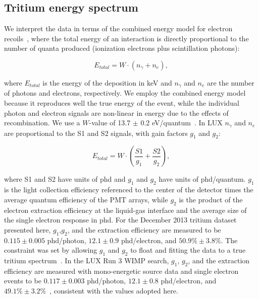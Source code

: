 \subsection{Tritium energy spectrum}

We interpret the data in terms of the combined energy model for electron recoils~\cite{Platzman}, where the total energy of an interaction is directly proportional to the number of quanta produced (ionization electrons plus scintillation photons):

\begin{equation}
E_{total} = W \cdot (n_{\gamma} + n_e ),
\label{platzman_eq}
\end{equation}

\noindent
where $E_{total}$ is the energy of the deposition in keV and  $n_\gamma$ and $n_e$ are the number of photons and electrons, respectively. We employ the combined energy model because it reproduces well the true energy of the event, while the individual photon and electron signals are non-linear in energy due to the effects of recombination. We use a $W$-value of 13.7 $\pm$ 0.2 eV/quantum~\cite{Dahl_Thesis}. In LUX $n_{\gamma}$ and $n_e$ are proportional to the S1 and S2 signals, with gain factors $g_1$ and $g_2$: 

\begin{equation}
E_{total} = W \cdot \left(\frac{S1}{g_1} + \frac{S2}{g_2} \right),
\label{energy_eq}
\end{equation}

\noindent
where S1 and S2 have units of phd and $g_1$ and $g_2$ have units of phd/quantum. $g_1$ is the light collection efficiency referenced to the center of the detector times the average quantum efficiency of the PMT arrays, while $g_2$ is the product of the electron extraction efficiency at the liquid-gas interface and the average size of the single electron response in phd. For the December 2013 tritium dataset presented here, $g_1$,$g_2$, and the extraction efficiency are measured to be $0.115 \pm 0.005$ phd/photon, $12.1 \pm 0.9$ phd/electron, and $50.9\% \pm 3.8\%$. The constraint was set by allowing $g_1$ and $g_2$ to float and fitting the data to a true tritium spectrum~\cite{Drexlin:2013lha}.  In the LUX Run 3 WIMP search, $g_1$, $g_2$, and the extraction efficiency are measured with mono-energetic source data and single electron events to be $0.117 \pm 0.003$ phd/photon, $12.1 \pm 0.8$ phd/electron, and $49.1\% \pm 3.2\%$~\cite{lux-reanalysis, lux-prd}, consistent with the values adopted here. 

